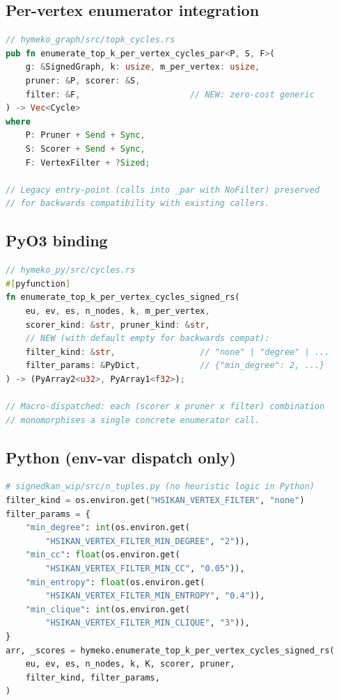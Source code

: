 \documentclass[11pt,a4paper]{article}
\begin{document}
\subsection*{Per-vertex enumerator integration}
\begin{lstlisting}[language=rust]
// hymeko_graph/src/topk_cycles.rs
pub fn enumerate_top_k_per_vertex_cycles_par<P, S, F>(
    g: &SignedGraph, k: usize, m_per_vertex: usize,
    pruner: &P, scorer: &S,
    filter: &F,                      // NEW: zero-cost generic
) -> Vec<Cycle>
where
    P: Pruner + Send + Sync,
    S: Scorer + Send + Sync,
    F: VertexFilter + ?Sized;

// Legacy entry-point (calls into _par with NoFilter) preserved
// for backwards compatibility with existing callers.
\end{lstlisting}

\subsection*{PyO3 binding}
\begin{lstlisting}[language=rust]
// hymeko_py/src/cycles.rs
#[pyfunction]
fn enumerate_top_k_per_vertex_cycles_signed_rs(
    eu, ev, es, n_nodes, k, m_per_vertex,
    scorer_kind: &str, pruner_kind: &str,
    // NEW (with default empty for backwards compat):
    filter_kind: &str,                 // "none" | "degree" | ...
    filter_params: &PyDict,            // {"min_degree": 2, ...}
) -> (PyArray2<u32>, PyArray1<f32>);

// Macro-dispatched: each (scorer x pruner x filter) combination
// monomorphises a single concrete enumerator call.
\end{lstlisting}

\subsection*{Python (env-var dispatch only)}
\begin{lstlisting}[language=python]
# signedkan_wip/src/n_tuples.py (no heuristic logic in Python)
filter_kind = os.environ.get("HSIKAN_VERTEX_FILTER", "none")
filter_params = {
    "min_degree": int(os.environ.get(
        "HSIKAN_VERTEX_FILTER_MIN_DEGREE", "2")),
    "min_cc": float(os.environ.get(
        "HSIKAN_VERTEX_FILTER_MIN_CC", "0.05")),
    "min_entropy": float(os.environ.get(
        "HSIKAN_VERTEX_FILTER_MIN_ENTROPY", "0.4")),
    "min_clique": int(os.environ.get(
        "HSIKAN_VERTEX_FILTER_MIN_CLIQUE", "3")),
}
arr, _scores = hymeko.enumerate_top_k_per_vertex_cycles_signed_rs(
    eu, ev, es, n_nodes, k, K, scorer, pruner,
    filter_kind, filter_params,
)
\end{lstlisting}
\end{document}
